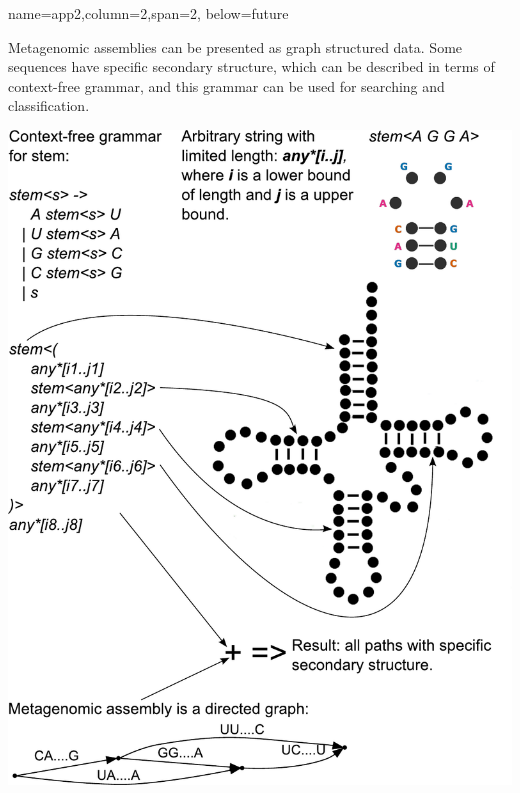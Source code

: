\documentclass[a0paper,portrait]{baposter}
\begin{document}
\begin{poster}
{name=app2,column=2,span=2, below=future}
{
Metagenomic assemblies can be presented as graph structured data.
Some sequences have specific secondary structure, which can be described in terms of context-free grammar, and this grammar can be used for searching and classification.

\begin{center}
\includegraphics[width=\textwidth]{secondaryStructure.pdf}
\end{center}
}




\end{poster}
\end{document}
